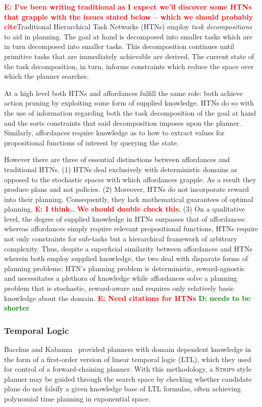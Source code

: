 \documentclass[conference]{IEEEtran}
\newcommand{\dnote}[1]{\textcolor{Green}{\textbf{D: #1}}}
\newcommand{\enote}[1]{\textcolor{Red}{\textbf{E: #1}}}
\begin{document}
\enote{I've been writing traditional as I expect we'll discover some HTNs that grapple with the issues stated below -- which we should probably cite}Traditional Hierarchical Task Networks (HTNs) employ \textit{task decompositions} to aid in planning. The goal at hand is decomposed into smaller tasks which are in turn decomposed into smaller tasks. This decomposition continues until primitive tasks that are immediately achievable are derived. The current state of the task decomposition, in turn, informs constraints which reduce the space over which the planner searches.

At a high level both HTNs and affordances fulfill the same role: both achieve action pruning by exploiting some form of supplied knowledge. HTNs do so with the use of information regarding both the task decomposition of the goal at hand and the sorts constraints that said decomposition imposes upon the planner. Similarly, affordances require knowledge as to how to extract values for propositional functions of interest by querying the state.

However there are three of essential distinctions between affordances and traditional HTNs. (1) HTNs deal exclusively with deterministic domains as opposed to the stochastic spaces with which affordances grapple. As a result they produce plans and not policies. (2) Moreover, HTNs do not incorporate reward into their planning. Consequently, they lack mathematical guarantees of optimal planning. \enote{I think.. We should double check this.} (3) On a qualitative level, the degree of supplied knowledge in HTNs surpasses that of affordances: whereas affordances simply require relevant propositional functions, HTNs require not only constraints for sub-tasks but a hierarchical framework of arbitrary complexity. Thus, despite a superficial similarity between affordances and HTNs wherein both employ supplied knowledge, the two deal with disparate forms of planning problems; HTN's planning problem is deterministic, reward-agnostic and necessitates a plethora of knowledge while affordances solve a planning problem that is stochastic, reward-aware and requires only relatively basic knowledge about the domain.
\enote{Need citations for HTNs}
\dnote{needs to be shorter}
\subsubsection{Temporal Logic}

Bacchus and Kabanza~\cite{Bacchus95usingtemporal,Bacchus99usingtemporal} provided
planners with domain dependent knowledge in the form of a first-order version of linear
temporal logic (LTL), which they used for control of a forward-chaining planner. With this methodology, 
a \textsc{Strips} style planner may be guided through the search space by checking 
whether candidate plans do not falsify a given knowledge base of LTL formulas, often
achieving polynomial time planning in exponential space.
\end{document}
